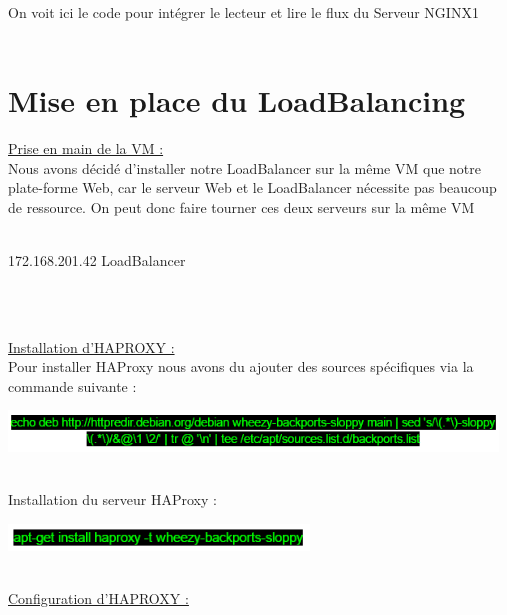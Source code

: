 \documentclass{report}
\begin{document}
    \\
    On voit ici le code pour intégrer le lecteur et lire le flux du Serveur NGINX1
    \\
    \\
    \section{Mise en place du LoadBalancing}  
    
    \underline{Prise en main de la VM :}\\
    
    Nous avons décidé d’installer notre LoadBalancer sur la même VM que notre plate-forme Web, car le serveur Web et le LoadBalancer nécessite pas beaucoup de ressource. On peut donc faire tourner ces deux serveurs sur la même VM
    \\
    \\
    
        \begin{center}

    172.168.201.42 	\rightarrow 	LoadBalancer
    
        \end{center}

    \\
    \\
    \newpage
    
    \underline{Installation  d’HAPROXY :}\\
    
    Pour installer HAProxy nous avons du ajouter des sources spécifiques via la commande suivante :




    \begin{center}
    \includegraphics[width=13cm]{img/bash.PNG}
    \end{center}
    \\
    Installation du serveur HAProxy :


    \begin{center}
    \includegraphics[width=8cm]{img/bash2.PNG}
    \end{center}
    \\
    
    \underline{Configuration d’HAPROXY :}\\
    
\end{document}
